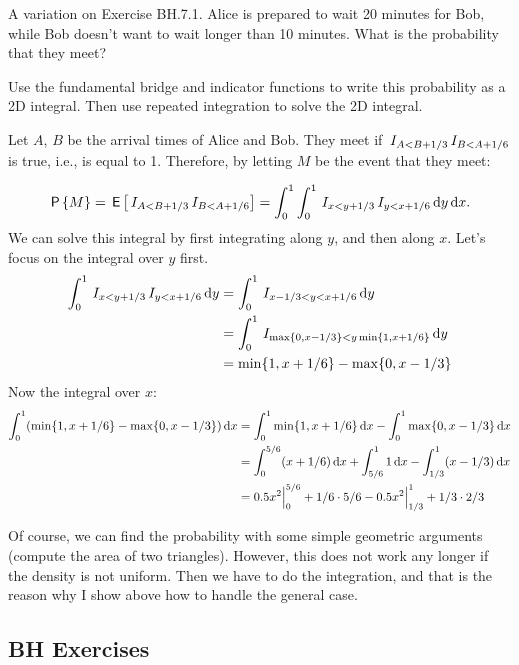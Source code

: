 \begin{exercise}
A variation on Exercise BH.7.1. Alice is prepared to wait 20 minutes for Bob, while Bob doesn't want to wait longer than 10 minutes. What is the probability that they meet?

Use the fundamental bridge and indicator functions to write this probability as a 2D integral. Then use repeated integration to solve the 2D integral.
\begin{solution}
Let $A$, $B$ be the arrival times of Alice and Bob. They meet if $\,I_{A<B+1/3}\,I_{B<A+1/6}$ is true, i.e., is equal to 1. Therefore, by letting $M$ be the event that they meet:

\begin{equation*}
\,\mathsf{P}\left\{M\right\} = \,\mathsf{E}\left[\,I_{A<B+1/3}\,I_{B<A+1/6}\right] = \int_0^1\int_0^1 \,I_{x<y+1/3}\,I_{y<x+1/6} \,\textrm{d}y \,\textrm{d}x.
\end{equation*}
We can solve this integral by first integrating along $y$, and then along $x$. Let's focus on the integral over $y$ first.
\begin{align*}
\int_0^1 \,I_{x<y+1/3}\,I_{y<x+1/6} \,\textrm{d}y
&=\int_0^1 \,I_{x-1/3<y<x+1/6} \,\textrm{d}y \\
&=\int_0^1 \,I_{\max\{0, x-1/3\} <y \min\{1,x+1/6\} } \,\textrm{d}y \\
&= \min\{1,x+1/6\} - \max\{0, x-1/3\}
\end{align*}
Now the integral over $x$:
\begin{align*}
  \int_0^1 (\min\{1,x+1/6\} - \max\{0, x-1/3\}) \,\textrm{d}x
&=  \int_0^1 \min\{1,x+1/6\}\,\textrm{d}x - \int_0^{1}\max\{0, x-1/3\} \,\textrm{d}x  \\
&=  \int_0^{5/6}(x+1/6)\,\textrm{d}x + \int_{5/6}^{1}1 \,\textrm{d}x
 - \int_{1/3}^{1}(x-1/3) \,\textrm{d}x \\
  &=0.5 x^2\Big|_{0}^{5/6} + 1/6\cdot 5/6 - 0.5x^2\Big|_{1/3}^1 + 1/3\cdot 2/3
\end{align*}

Of course, we can find the probability with some simple geometric arguments (compute the area of two triangles). However, this does not work any longer if the density is not uniform.  Then we have to do the integration, and that is the reason why I show above how to handle the general case.
\end{solution}
\end{exercise}

\subsection{BH Exercises}
\label{sec:bh-exercises-1}


